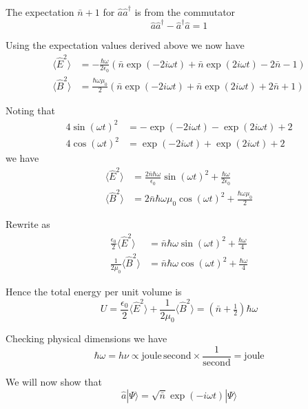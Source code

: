 \documentclass[12pt]{article}
\begin{document}
The expectation $\bar n+1$ for $\hat a\hat a^\dag$ is from the commutator
\begin{equation*}
\hat a\hat a^\dag-\hat a^\dag\hat a=1
\end{equation*}

Using the expectation values derived above we now have
\begin{align*}
\langle\hat E^2\rangle
&=-\frac{\hbar\omega}{2\epsilon_0}
\left(\bar n\exp(-2i\omega t)+\bar n\exp(2i\omega t)-2\bar n-1\right)
\\
\langle\hat B^2\rangle
&=\frac{\hbar\omega\mu_0}{2}
\left(\bar n\exp(-2i\omega t)+\bar n\exp(2i\omega t)+2\bar n+1\right)
\end{align*}

Noting that
\begin{align*}
4\sin(\omega t)^2&=-\exp(-2i\omega t)-\exp(2i\omega t)+2\\
4\cos(\omega t)^2&=\exp(-2i\omega t)+\exp(2i\omega t)+2
\end{align*}
we have
\begin{align*}
\langle\hat E^2\rangle
&=\frac{2\bar n\hbar\omega}{\epsilon_0}\sin(\omega t)^2+\frac{\hbar\omega}{2\epsilon_0}
\\
\langle\hat B^2\rangle
&=2\bar n\hbar\omega\mu_0\cos(\omega t)^2+\frac{\hbar\omega\mu_0}{2}
\end{align*}

Rewrite as
\begin{align*}
\frac{\epsilon_0}{2}\langle\hat E^2\rangle&=\bar n\hbar\omega\sin(\omega t)^2+\frac{\hbar\omega}{4}
\\
\frac{1}{2\mu_0}\langle\hat B^2\rangle&=\bar n\hbar\omega\cos(\omega t)^2+\frac{\hbar\omega}{4}
\end{align*}

Hence the total energy per unit volume is
\begin{equation*}
U=\frac{\epsilon_0}{2}\langle\hat E^2\rangle
+\frac{1}{2\mu_0}\langle\hat B^2\rangle
=\left(\bar n+\tfrac{1}{2}\right)\hbar\omega
\end{equation*}

Checking physical dimensions we have
\begin{equation*}
\hbar\omega=h\nu\propto\text{joule}\,\text{second}\times\frac{1}{\text{second}}=\text{joule}
\end{equation*}

We will now show that
\begin{equation*}
\hat a|\Psi\rangle=\sqrt{\bar n}\exp(-i\omega t)|\Psi\rangle
\end{equation*}
\end{document}
